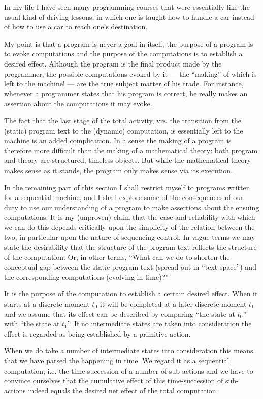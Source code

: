 In my life I have seen many programming courses that were essentially like the usual kind of driving lessons, in which one is taught how to handle a car
instead of how to use a car to reach one's destination.

My point is that a program is never a goal in itself; the purpose of a program is to evoke computations and the purpose of the computations is to establish a desired effect. Although the program is the final product made by the programmer, the possible computations evoked by it --- the ``making'' of which is left to the machine! --- are the true subject matter of his trade. For instance, whenever a programmer states that his program is correct, he really makes an assertion about the computations it may evoke.

The fact that the last stage of the total activity, viz. the transition from the (static) program text to the (dynamic) computation, is essentially left to the machine is an added complication. In a sense the making of a program is therefore more difficult than the making of a mathematical theory: both program and theory are structured, timeless objects. But while the mathematical theory makes sense as it stands, the program only makes sense via its execution.

In the remaining part of this section I shall restrict myself to programs written for a sequential machine, and I shall explore some of the consequences of our duty to use our understanding of a program to make assertions about the ensuing computations. It is my (unproven) claim that the ease and reliability with which we can do this depends critically upon the simplicity of the relation between the two, in particular upon the nature of sequencing control. In vague terms we may state the desirability that the structure of the program text reflects the structure of the computation. Or, in other terms, ``What can we do to shorten the conceptual gap between the static program
text (spread out in ``text space'') and the corresponding computations (evolving in time)?''

It is the purpose of the computation to establish a certain desired effect. When it starts at a discrete moment $t_0$ it will be completed at a later discrete moment $t_1$ and we assume that its effect can be described by comparing ``the state at $t_0$'' with ``the state at $t_1$''. If no intermediate states are taken into consideration the effect is regarded as being established by a primitive action.

When we do take a number of intermediate states into consideration this means that we have parsed the happening in time. We regard it as a sequential computation, i.e. the time-succession of a number of sub-actions and we have to convince ourselves that the cumulative effect of this time-succession of sub-actions indeed equals the desired net effect of the total computation.


